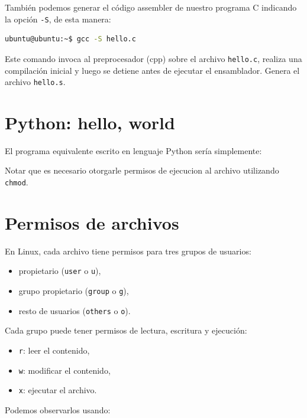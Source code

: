 \documentclass[11pt,a4paper]{article}
\newcommand{\inputcode}[2][]{%
  \par\noindent\begin{minipage}{\linewidth}
    
  \end{minipage}\par}
\begin{document}
También podemos generar el código assembler de nuestro programa C indicando la opción \lstinline!-S!, de esta manera:

\begin{lstlisting}[language=bash]
ubuntu@ubuntu:~$ gcc -S hello.c
\end{lstlisting}

Este comando invoca al preprocesador (cpp) sobre el archivo \lstinline!hello.c!, realiza una compilación inicial y luego se detiene antes de ejecutar el ensamblador. Genera el archivo \lstinline!hello.s!.

\section{Python: hello, world}

El programa equivalente escrito en lenguaje Python sería simplemente:

\inputcode[language=Python]{../examples/tp1/hello/hello.py}

\inputcode[language=bash]{../examples/tp1/hello/python.session}

Notar que es necesario otorgarle permisos de ejecucion al archivo utilizando \lstinline!chmod!.

\section{Permisos de archivos}

En Linux, cada archivo tiene permisos para tres grupos de usuarios:

\begin{itemize}[nosep]
  \item propietario (\texttt{user} o \texttt{u}),
  \item grupo propietario (\texttt{group} o \texttt{g}),
  \item resto de usuarios (\texttt{others} o \texttt{o}).
\end{itemize}

Cada grupo puede tener permisos de lectura, escritura y ejecución:

\begin{itemize}[nosep]
  \item \texttt{r}: leer el contenido,
  \item \texttt{w}: modificar el contenido,
  \item \texttt{x}: ejecutar el archivo.
\end{itemize}

Podemos observarlos usando:
\end{document}
